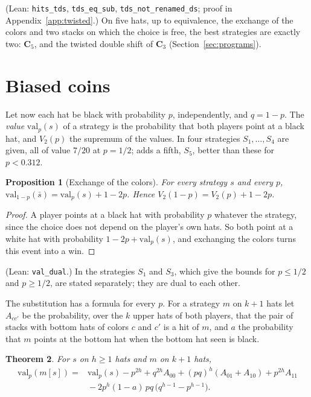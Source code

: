 \documentclass[11pt,a4paper]{article}
\newtheorem{theorem}{Theorem}
\newtheorem{proposition}[theorem]{Proposition}
\theoremstyle{definition}
\theoremstyle{remark}
\newcommand{\lean}[1]{\texttt{#1}}
\newcommand{\C}{\mathbf{C}}
\begin{document}
(Lean: \lean{hits\_tds}, \lean{tds\_eq\_sub},
\lean{tds\_not\_renamed\_ds}; proof in Appendix~\ref{app:twisted}.) On five hats, up to equivalence, the
exchange of the colors and two stacks on which the choice is free, the
best strategies are exactly two: $\C_5$, and the twisted double shift of
$\C_3$ (Section~\ref{sec:programs}).

\section{Biased coins}\label{sec:bias}

Let now each hat be black with probability $p$, independently, and
$q = 1-p$. The \emph{value} $\mathrm{val}_p(s)$ of a strategy is the
probability that both players point at a black hat, and $V_2(p)$ the
supremum of the values. In \cite{BFG} four strategies $S_1,\ldots,S_4$
are given, all of value $7/20$ at $p = 1/2$; \cite{BCCZW} adds a fifth,
$S_5$, better than these for $p < 0.312$.

\begin{proposition}[Exchange of the colors]\label{prop:dual}
For every strategy $s$ and every $p$,
$\mathrm{val}_{1-p}(\bar s) = \mathrm{val}_p(s) + 1 - 2p$. Hence
$V_2(1-p) = V_2(p) + 1 - 2p$.
\end{proposition}

\begin{proof}
A player points at a black hat with probability $p$ whatever the
strategy, since the choice does not depend on the player's own hats. So
both point at a white hat with probability $1 - 2p + \mathrm{val}_p(s)$,
and exchanging the colors turns this event into a win.
\end{proof}

(Lean: \lean{val\_dual}.) In \cite{BFG} the strategies $S_1$ and $S_3$,
which give the bounds for $p \le 1/2$ and $p \ge 1/2$, are stated
separately; they are dual to each other.

The substitution has a formula for every $p$. For a strategy $m$ on
$k+1$ hats let $A_{cc'}$ be the probability, over the $k$ upper hats of
both players, that the pair of stacks with bottom hats of colors $c$ and
$c'$ is a hit of $m$, and $a$ the probability that $m$ points at the
bottom hat when the bottom hat seen is black.

\begin{theorem}\label{thm:valsub}
For $s$ on $h \ge 1$ hats and $m$ on $k+1$ hats,
\begin{align*}
  \mathrm{val}_p(m[s]) = {} & \mathrm{val}_p(s) - p^{2h}
    + q^{2h} A_{00} + (pq)^h (A_{01} + A_{10}) + p^{2h} A_{11} \\
  & {} - 2p^h (1-a)\, pq\, \bigl(q^{h-1} - p^{h-1}\bigr) .
\end{align*}
\end{theorem}
\end{document}
